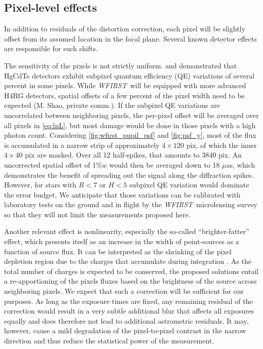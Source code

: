 \documentclass[modern, times]{aastex61}
\newcommand\wfirst{\textit{WFIRST}}
\begin{document}
\subsection{Pixel-level effects}

In addition to residuals of the distortion correction, each pixel will be slightly offset from its assumed location in the focal plane.
Several known detector effects are responsible for such shifts.

The sensitivity of the pixels is not strictly uniform.
\citet{Barron2007} and \citet{Hardy2014} demonstrated that HgCdTe detectors exhibit subpixel quantum efficiency (QE) variations of several percent in some pixels.
While \wfirst\ will be equipped with more advanced H4RG detectors, spatial offsets of a few percent of the pixel width need to be expected (M. Shao, private comm.).
If the subpixel QE variations are uncorrelated between neighboring pixels, the per-pixel offset will be averaged over all pixels in \autoref{eq:lnL}, but most damage would be done in those pixels with a high photon count.
Considering \autoref{fig:wfirst_pupil_psf} and \autoref{fig:psf_y}, most of the flux is accumulated in a narrow strip of approximately $4\times120$ pix, of which the inner $4\times40$ pix are masked.
Over all 12 half-spikes, that amounts to 3840 pix.
An uncorrected spatial offset of 1\%$w$ would then be averaged down to 18 $\mu$as, which demonstrates the benefit of spreading out the signal along the diffraction spikes.
However, for stars with $R<7$ or $H<5$ subpixel QE variation would dominate the error budget.
We anticipate that those variations can be calibrated with laboratory tests on the ground and in flight by the \wfirst\ microlensing survey \citep[their section 2.5.7]{Spergel2015} so that they will not limit the measurements proposed here.

Another relevant effect is nonlinearity, especially the so-called ``brighter-fatter'' effect, which presents itself as an increase in the width of point-sources as a function of source flux.
It can be interpreted as the shrinking of the pixel depletion region due to the charges that accumulate during integration \citep[and references therein]{Plazas2017}.
As the total number of charges is expected to be conserved, the proposed solutions entail a re-apportioning of the pixels fluxes based on the brightness of the source across neighboring pixels.
We expect that such a correction will be sufficient for our purposes.
As long as the exposure times are fixed, any remaining residual of the correction would result in a very subtle additional blur that affects all exposures equally and does therefore not lead to additional astrometric residuals.
It may, however, cause a mild degradation of the pixel-to-pixel contrast in the narrow direction and thus reduce the statistical power of the measurement.
\end{document}

